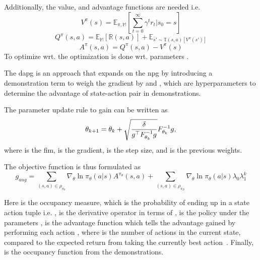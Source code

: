 Additionally, the value,  and advantage functions are needed i.e.
\begin{equation}
	V^\pi(s)=\mathbb{E}_{\pi,\mathbb{M}}\left[ \sum^\infty_{t=0} \gamma^t r_t | s_0 = s \right]
\end{equation}
\begin{equation}
	Q^\pi(s,a)=\mathbb{E}_{\mathbb{M}}\left[ \mathbb{R}(s,a) \right] + \mathbb{E}_{s'\sim \mathbb{T}(s,a)\left[ V^\pi (s') \right]}
\end{equation}
\begin{equation}
	A^\pi(s,a) = Q^\pi (s,a) - V^\pi (s)
\end{equation}
To optimize wrt. \mvar{\pi_\theta} the optimization is done wrt. parameters \mvar{\theta}.

The \gls{dapg} is an approach that expands on the \gls{npg} by introducing a demonstration term to weigh the gradient by  and , which are hyperparameters to determine the advantage of state-action pair in demonstrations. \medskip

The parameter update rule to gain  can be written as
%
\begin{equation}
    \theta_{k+1} = \theta_k + \sqrt{\frac{\delta}{g^\top F^{-1}_{\theta_k}g}}F^{-1}_{\theta_k}g,
\end{equation}
where  is the \gls{fim},  is the gradient, \mvar{\delta} is the step size, and  is the previous weights.\medskip

The objective function is thus formulated as 
%
\begin{equation}\label{eq:dapg}
    g_{aug} = \sum_{(s,a)\in\rho_{\pi_\theta}}\nabla_\theta \ln \pi_\theta(a|s)A^{\pi_\theta}(s,a) + \sum_{(s,a)\in\rho_{\pi_D}} \nabla_\theta \ln \pi_\theta(a|s) \lambda_0 \lambda_1^k
\end{equation}

Here \mvar{\rho_{\pi_\theta}} is the occupancy measure, which is the probability of ending up in a state action tuple i.e. , \mvar{\nabla_\theta} is the derivative operator in terms of \mvar{\theta}, \mvar{\pi_\theta} is the policy under the parameters \mvar{\theta},  is the advantage function which tells the advantage gained by performing each action , where  is the number of actions in the current state, compared to the expected return from taking the currently best action~\cite{advantage-updating}. Finally,  is the occupancy function from the demonstrations.

